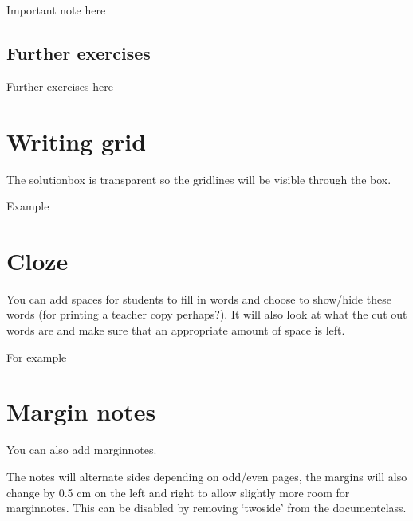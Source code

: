 \documentclass[11pt,a4paper,twoside]{report}
\begin{document}
\begin{important}
  Important note here
\end{important}

\subsection{Further exercises}

\begin{further}
  Further exercises here
\end{further}

\section{Writing grid}

\GridOn


\begin{note}
  The solutionbox is transparent so the gridlines will be visible through the box.
\end{note}

\begin{example}{}
  Example
\end{example}

\section{Cloze}

You can add spaces for students to fill in words and choose to show/hide these words (for printing a teacher copy perhaps?). It will also look at what the cut out words are and make sure that an appropriate amount of space is left.


For example 


\section{Margin notes}
You can also add marginnotes. 

The notes will alternate sides depending on odd/even pages, the margins will also change by 0.5 cm on the left and right to allow slightly more room for marginnotes. This can be disabled by removing `twoside' from the documentclass.
\end{document}
